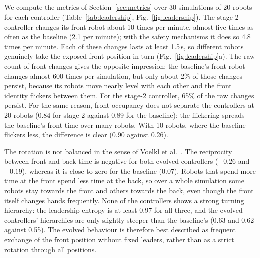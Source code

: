 \subsection{\texorpdfstring{}{Leadership and Position Changes}}
\label{sec:leadership_results}
\begingroup\color{red}
We compute the metrics of Section~\ref{sec:metrics} over 30 simulations of 20 robots for each
controller (Table~\ref{tab:leadership}, Fig.~\ref{fig:leadership}). The stage-2 controller
changes its front robot about 10 times per minute, almost five times as often as the baseline
(2.1 per minute); with the safety mechanisms it does so 4.8 times per minute. Each of these
changes lasts at least 1.5\,s, so different robots genuinely take the exposed front position
in turn (Fig.~\ref{fig:leadership}a). The raw count of front changes gives the opposite
impression: the baseline's front robot changes almost 600 times per simulation, but only
about 2\% of those changes persist, because its robots move nearly level with each other and
the front identity flickers between them. For the stage-2 controller, 65\% of the raw changes
persist. For the same reason, front occupancy does not separate the controllers at 20 robots
(0.84 for stage 2 against 0.89 for the baseline): the flickering spreads the baseline's front
time over many robots. With 10 robots, where the baseline flickers less, the difference is
clear (0.90 against 0.26).

The rotation is not balanced in the sense of Voelkl et al.~\cite{voelkl2015}. The
reciprocity between front and back time is negative for both evolved controllers ($-0.26$
and $-0.19$), whereas it is close to zero for the baseline ($0.07$). Robots that spend more
time at the front spend less time at the back, so over a whole simulation some robots stay
towards the front and others towards the back, even though the front itself changes hands
frequently. None of the controllers shows a strong turning hierarchy: the leadership entropy
is at least 0.97 for all three, and the evolved controllers' hierarchies are only slightly
steeper than the baseline's (0.63 and 0.62 against 0.55). The evolved behaviour is therefore
best described as frequent exchange of the front position without fixed leaders, rather than
as a strict rotation through all positions.
\endgroup

